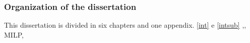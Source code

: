 \subsubsection{Organization of the dissertation}\label{intsub}
%
This dissertation is divided in six chapters and one appendix.
\autoref{int} e \autoref{intsub}
,, \gls{MILP}, %
% 
% 
% 
% 
% 
